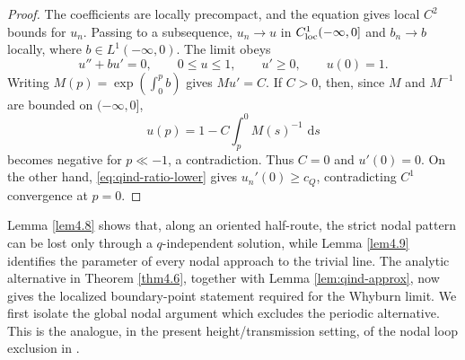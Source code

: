 \documentclass[11pt,reqno]{amsart}
\numberwithin{equation}{section}
\newcommand{\dd}{\,\mathrm{d}}
\theoremstyle{definition}
\theoremstyle{remark}
\begin{document}
\begin{proof}
The coefficients are locally precompact, and the equation gives
local $C^2$ bounds for $u_n$.  Passing to a subsequence,
$u_n\to u$ in $C^1_{\rm loc}(-\infty,0]$ and
$b_n\to b$ locally, where $b\in L^1(-\infty,0)$.  The limit obeys
\[
 u''+bu'=0,
 \qquad 0\leq u\leq1,
 \qquad u'\geq0,
 \qquad u(0)=1.
\]
Writing $M(p)=\exp(\int_0^p b)$ gives $Mu'=C$.  If $C>0$, then,
since $M$ and $M^{-1}$ are bounded on $(-\infty,0]$,
\[
 u(p)=1-C\int_p^0M(s)^{-1}\,\dd s
\]
becomes negative for $p\ll-1$, a contradiction.  Thus $C=0$ and
$u'(0)=0$.  On the other hand,
\eqref{eq:qind-ratio-lower} gives $u_n'(0)\geq c_Q$, contradicting
$C^1$ convergence at $p=0$.
\end{proof}

Lemma \ref{lem4.8} shows that, along an oriented half-route, the
strict nodal pattern can be lost only through a $q$-independent
solution, while Lemma \ref{lem4.9} identifies the parameter of every
nodal approach to the trivial line.  The analytic alternative in
Theorem \ref{thm4.6}, together with Lemma \ref{lem:qind-approx}, now
gives the localized boundary-point statement required for the
Whyburn limit.  We first isolate the global nodal argument which
excludes the periodic alternative.  This is the analogue, in the present
height/transmission setting, of the nodal loop exclusion in
\cite[Section 4]{ConstantinSV}.
\end{document}
